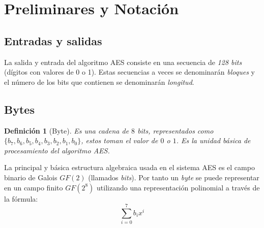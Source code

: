 \documentclass[peerreview]{IEEEtran}
\newtheorem{defin}{Definición}
\begin{document}
\section{Preliminares y Notaci\'on}
\subsection{Entradas y salidas}
La salida y entrada del algoritmo AES consiste en una secuencia de \textit{128 bits} (dígitos con valores de 0 o 1). Estas secuencias a veces se denominarán \textit{bloques} y el número de
los bits que contienen se denominarán \textit{longitud}.
\subsection{Bytes}
\begin{defin}[Byte]
   Es una cadena de $8$ \textit{bits}, representados como $\{b_7, b_6, b_5, b_4, b_3, b_2, b_1, b_0\}$, estos toman el valor de $0$ o $1$. Es la unidad básica de procesamiento del algoritmo AES.
\end{defin}
\bigbreak
La principal y básica estructura algebraica usada en el sistema AES es el campo binario de Galois $GF(2)$ (llamados \textit{bits}). Por tanto un \textit{byte} se puede representar en un campo finito $GF(2^8)$ utilizando una representación polinomial a través de la fórmula:
$$\sum_{i=0}^{7}b_{i}x^{i}$$
\end{document}
